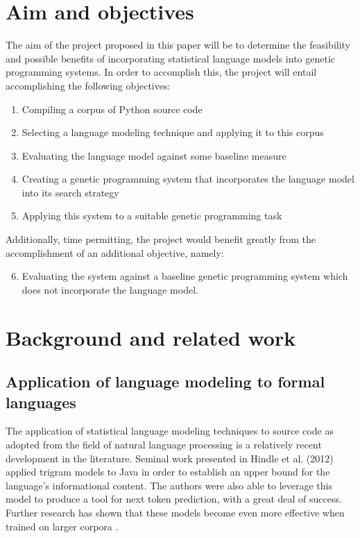 \documentclass[a4paper,11pt]{proposal}
\begin{document}
\section{Aim and objectives}

The aim of the project proposed in this paper will be to determine the feasibility and possible benefits of incorporating statistical language models into genetic programming systems. In order to accomplish this, the project will entail accomplishing the following objectives:

\begin{enumerate}
\item Compiling a corpus of Python source code
\item Selecting a language modeling technique and applying it to this corpus
\item Evaluating the language model against some baseline measure
\item Creating a genetic programming system that incorporates the language model into its search strategy
\item Applying this system to a suitable genetic programming task
\end{enumerate}

Additionally, time permitting, the project would benefit greatly from the accomplishment of an additional objective, namely:

\begin{enumerate}

\setcounter{enumi}{5}
\item Evaluating the system against a baseline genetic programming system which does not incorporate the language model.

\end{enumerate}

\section{Background and related work} \label{sec:back}

\subsection{Application of language modeling to formal languages}

The application of statistical language modeling techniques to source code as adopted from the field of natural language processing is a relatively recent development in the literature. Seminal work presented in Hindle et al. (2012) \cite{hindle2012} applied trigram models to Java in order to establish an upper bound for the language's informational content. The authors were also able to leverage this model to produce a tool for next token prediction, with a great deal of success. Further research has shown that these models become even more effective when trained on larger corpora \cite{allamanis2013}.
\end{document}
